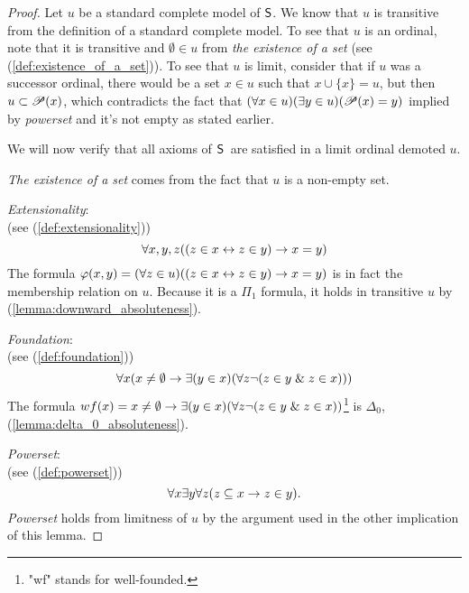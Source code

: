 \begin{proof}
Let $u$ be a standard complete model of $\sf{S}$. We know that $u$ is transitive from the definition of a standard complete model. 
To see that $u$ is an ordinal, note that it is transitive and $\emptyset \in u$ from \emph{the existence of a set} (see (\ref{def:existence_of_a_set})). To see that $u$ is limit, consider that if $u$ was a successor ordinal, there would be a set $x \in u$ such that $x \cup \{x\} = u$, but then $u \subset \mathscr{P} (x)$, which contradicts the fact that $(\forall x\in u)(\exists y \in u)(\mathscr{P} (x) = y)$ implied by \emph{powerset} and it's not empty as stated earlier.

We will now verify that all axioms of $\sf{S}$ are satisfied in a limit ordinal demoted $u$.

\bce[(i)]
\item \emph{The existence of a set} comes from the fact that $u$ is a non-empty set.

\item \emph{Extensionality}: \\(see (\ref{def:extensionality}))
\begin{equation}
\forall x, y, z ((z \in x \leftrightarrow z \in y) \rightarrow x = y)
\end{equation}
The formula $\varphi(x, y) = (\forall z \in u)((z \in x \leftrightarrow z \in y) \rightarrow x = y)$ is in fact the membership relation on $u$. Because it is a $\Pi_1$ formula, it holds in transitive $u$ by (\ref{lemma:downward_absoluteness}).

\item \emph{Foundation}: \\(see (\ref{def:foundation}))
\begin{equation}
\forall x (x \neq \emptyset \rightarrow \exists (y \in x) (\forall z \neg (z \in y \mathrel{\&} z \in x)))
\end{equation}
The formula $wf(x) = x \neq \emptyset \rightarrow \exists (y \in x) (\forall z \neg (z \in y \mathrel{\&} z \in x))$\footnote{"wf" stands for well-founded.} is $\Delta_0$, (\ref{lemma:delta_0_absoluteness}).

\item \emph{Powerset}: \\(see (\ref{def:powerset}))
\begin{equation}
\forall x \exists y \forall z (z \subseteq x \rightarrow z \in y).
\end{equation}
\emph{Powerset} holds from limitness of $u$ by the argument used in the other implication of this lemma.


\end{proof}
